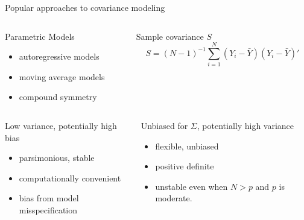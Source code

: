 \begin{frame}[c]{Popular approaches to covariance modeling}

	\begin{center}
	
	\begin{columns}[T]
	
	\begin{column}{0.5\textwidth}
	
	\begin{varalertblock}[5.5cm]{\small Parametric Models}
	\footnotesize
	\begin{itemize}
	\item autoregressive models
	\item moving average models
	\item compound symmetry
	\end{itemize}
	\end{varalertblock}
	\end{column}
	
	\begin{column}{0.5\textwidth}
	
	\begin{varalertblock}[5.5cm]{\small Sample covariance $S$}
	\scriptsize
	\[
	S = \left(N-1\right)^{-1} \sum_{i = 1}^N \left(Y_i - \bar{Y}\right)\left(Y_i - \bar{Y}\right)'
	\]
	\end{varalertblock}
	\end{column}
	\end{columns}

	\begin{columns}[T]

	\begin{column}{0.5\textwidth}
	\begin{varblock}[5.5cm]{\small Low variance, potentially high bias}
	\footnotesize
	\begin{itemize}
	\item parsimonious, stable
	\item computationally convenient
	\item bias from model misspecification
	\end{itemize}	
	\end{varblock}
	\end{column}
	
	\begin{column}{0.5\textwidth}
	\begin{varblock}[5.5cm]{\small Unbiased for $\Sigma$, potentially high variance}
	\footnotesize
		\begin{itemize}
		\item flexible, unbiased
		\item positive definite
		\item unstable even when $N > p$ and $p$ is moderate.
		\end{itemize}	
	\end{varblock}
	\end{column}
	
	\end{columns}
\end{center}
\end{frame}




